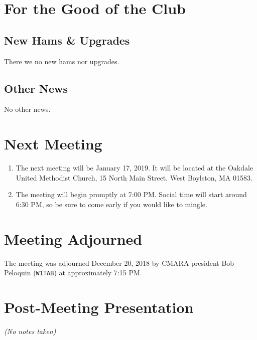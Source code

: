 \documentclass[10pt,letterpaper]{article}
\begin{document}
\section{For the Good of the Club}

\subsection{New Hams \& Upgrades}
There we no new hams nor upgrades.

\subsection{Other News}
No other news.

\section{Next Meeting}
\begin{enumerate}
  \item The next meeting will be January 17, 2019. It will be located at the Oakdale United Methodist Church, 15 North Main Street, West Boylston, MA 01583.
  \item The meeting will begin promptly at 7:00 PM. Social time will start around 6:30 PM, so be sure to come early if you would like to mingle.
\end{enumerate}

\section{Meeting Adjourned}
The meeting was adjourned December 20, 2018 by CMARA president Bob Peloquin (\texttt{W1TAB}) at approximately 7:15 PM.

\section{Post-Meeting Presentation}
\emph{(No notes taken)}
\end{document}
